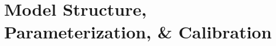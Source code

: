 \chapter{Model Structure, Parameterization, \& Calibration}\label{model}







\printchapterbibliography